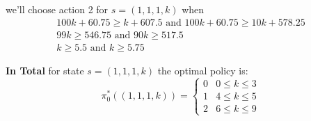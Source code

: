 \documentclass{assignmeownt}
\begin{document}
\begin{enumerate}
we'll choose action 2 for $s=(1, 1, 1, k)$ when
\newline
\begin{equation}
    \begin{array}{cc}
        100k + 60.75 \geq k + 607.5 \text{ and } 100k + 60.75 \geq 10k + 578.25 \\
        99k \geq 546.75 \text{ and } 90k \geq 517.5 \\
        k \geq 5.5 \text{ and } k \geq 5.75
    \end{array}
\end{equation}

\textbf{In Total} for state $s=(1, 1, 1, k)$ the optimal policy is:
\begin{equation}
\pi^*_0((1, 1, 1, k)) = 
\begin{cases}
0 & 0 \leq k \leq 3 \\
1 & 4 \leq k \leq 5 \\
2 & 6 \leq k \leq 9
\end{cases}
\end{equation}
\qedsymbol{}


\end{enumerate} %
\end{document}
